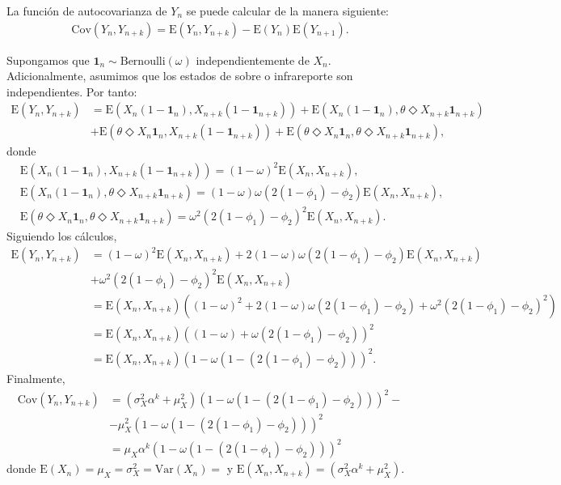 \documentclass[12pt,twoside]{article} %
\begin{document}
\medskip

\noindent La función de autocovarianza de $Y_n$ se puede calcular de la manera siguiente:
\begin{align}\label{cov}
\textrm{Cov}\left(Y_n,Y_{n+k}\right)=\textrm{E}\left(Y_n,Y_{n+k}\right)-\textrm{E}(Y_n)\textrm{E}(Y_{n+1}). 
\end{align}

\noindent Supongamos que $\textbf{1}_n \sim \textrm{Bernoulli}(\omega)$ independientemente de $X_n$. Adicionalmente, asumimos que los estados de sobre o infrareporte son independientes. Por tanto:
\begin{align}\label{exp}
\textrm{E}\left(Y_n,Y_{n+k}\right)&=\textrm{E}\left(X_n(1-\textbf{1}_n),X_{n+k}(1-\textbf{1}_{n+k})\right)+\textrm{E}\left(X_n(1-\textbf{1}_n),\theta \Diamond X_{n+k}\textbf{1}_{n+k}\right) \nonumber \\ &+\textrm{E}\left(\theta \Diamond X_n\textbf{1}_n,X_{n+k}(1-\textbf{1}_{n+k})\right)+\textrm{E}\left(\theta \Diamond X_n\textbf{1}_n,\theta \Diamond X_{n+k}\textbf{1}_{n+k}\right),
\end{align}
donde
\begin{align*}
&\textrm{E}\left(X_n(1-\textbf{1}_n),X_{n+k}(1-\textbf{1}_{n+k})\right)=(1-\omega)^2\textrm{E}(X_n,X_{n+k}), \\
&\textrm{E}\left(X_n(1-\textbf{1}_n),\theta \Diamond X_{n+k}\textbf{1}_{n+k}\right)=(1-\omega)\omega(2(1-\phi_1)-\phi_2)\textrm{E}(X_n,X_{n+k}), \\
&\textrm{E}\left(\theta \Diamond X_n\textbf{1}_n,\theta \Diamond X_{n+k}\textbf{1}_{n+k}\right)=\omega^2(2(1-\phi_1)-\phi_2)^2\textrm{E}(X_n,X_{n+k}).
\end{align*}
Siguiendo los cálculos, 
\begin{align*}
\textrm{E}\left(Y_n,Y_{n+k}\right)&=(1-\omega)^2\textrm{E}(X_n,X_{n+k})+2(1-\omega)\omega(2(1-\phi_1)-\phi_2)\textrm{E}(X_n,X_{n+k})\\&+\omega^2(2(1-\phi_1)-\phi_2)^2\textrm{E}(X_n,X_{n+k})\\&=\textrm{E}(X_n,X_{n+k})\left((1-\omega)^2+2(1-\omega)\omega(2(1-\phi_1)-\phi_2)+\omega^2(2(1-\phi_1)-\phi_2)^2\right)\\&=\textrm{E}(X_n,X_{n+k})\left((1-\omega)+\omega(2(1-\phi_1)-\phi_2)\right)^2\\&=\textrm{E}(X_n,X_{n+k})(1-\omega(1-\left(2(1-\phi_1)-\phi_2\right)))^2.
\end{align*}
Finalmente, 
\begin{align*}
\textrm{Cov}\left(Y_n,Y_{n+k}\right)&=(\sigma_X^2\alpha^k+\mu_X^2)(1-\omega(1-\left(2(1-\phi_1)-\phi_2\right)))^2-\\
& - \mu_X^2(1-\omega\left(1-\left(2(1-\phi_1)-\phi_2\right)\right))^2\\&=\mu_X\alpha^k(1-\omega(1-\left(2(1-\phi_1)-\phi_2\right)))^2
\end{align*}
donde $\textrm{E}(X_n)=\mu_X=\sigma_X^2=\textrm{Var}(X_n)=$ y $\textrm{E}(X_n,X_{n+k})=(\sigma_X^2\alpha^k+\mu_X^2)$.
\end{document}
